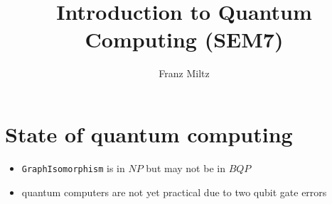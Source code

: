 \documentclass{article}
\title{Introduction to Quantum Computing (SEM7)}
\author{Franz Miltz}
\begin{document}
\maketitle

\section{State of quantum computing}

\begin{itemize}
  \item \texttt{GraphIsomorphism} is in $NP$ but may not be in $BQP$
  \item quantum computers are not yet practical due to two qubit gate errors
\end{itemize}
\end{document}
